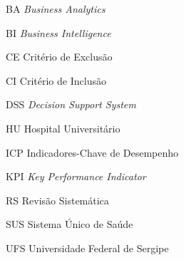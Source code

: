
\begin{siglas}
	\item[BA]{\textit{Business Analytics}}
    \item[BI]{\textit{Business Intelligence}}
    \item[CE]{Critério de Exclusão}
    \item[CI]{Critério de Inclusão}
    \item[DSS]{\textit{Decision Support System}}
  	\item[HU]{Hospital Universitário}
  	\item[ICP]{Indicadores-Chave de Desempenho}
    \item[KPI]{\textit{Key Performance Indicator}}
    \item[RS]{Revisão Sistemática}
    \item[SUS]{Sistema Único de Saúde}
	\item[UFS]{Universidade Federal de Sergipe}
	\item[]{}
\end{siglas}